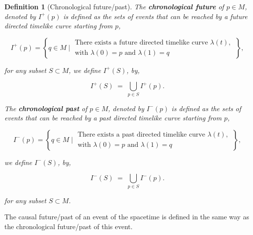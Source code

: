 \documentclass[11pt]{book}
\theoremstyle{break}
\newtheorem{definition}{Definition}
\begin{document}
\begin{definition}[Chronological future/past]
The \textbf{chronological future} of $p \in M$, denoted by $I^{+}(p)$ is defined as the sets of events that can be reached by a future directed timelike curve starting from $p$,

\begin{equation*}
I^{+}(p) = \left\{ q \in M \; \bigg| \; \begin{array}{l} \text{There exists a future directed timelike curve $\lambda(t)$,} \\ \text{with $\lambda(0)=p$ and $\lambda(1)=q$} \end{array} \; \right\},
\end{equation*}

for any subset $S \subset M$, we define $I^{+}(S)$, by,

\begin{equation*}
I^{+}(S) \; = \; \bigcup_{p \in S} I^{+}(p). 
\end{equation*}

The \textbf{chronological past} of $p \in M$, denoted by $I^{-}(p)$ is defined as the sets of events that can be reached by a past directed timelike curve starting from $p$,

\begin{equation*}
I^{-}(p) = \left\{ q \in M \; \bigg| \; \begin{array}{l} \text{There exists a past directed timelike curve $\lambda(t)$,} \\ \text{with $\lambda(0)=p$ and $\lambda(1)=q$} \end{array} \; \right\},
\end{equation*}

we define $I^{-}(S)$, by,

\begin{equation*}
I^{-}(S) \; = \; \bigcup_{p \in S} I^{-}(p). 
\end{equation*}

for any subset $S \subset M$. 

\end{definition}

The causal future/past of an event of the spacetime is defined in the same way as the chronological future/past of this event.
\end{document}
